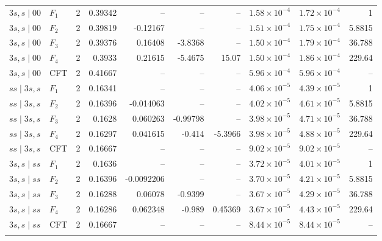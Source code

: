 \begin{longtable}{llcrrrrrrr}
\addlinespace[3pt]
$3s,s\mid 00$ & $F_1$ & 2 & 0.39342 & -- & -- & -- & $1.58\!\times\!10^{-4}$ & $1.72\!\times\!10^{-4}$ & 1 \\*
$3s,s\mid 00$ & $F_2$ & 2 & 0.39819 & -0.12167 & -- & -- & $1.51\!\times\!10^{-4}$ & $1.75\!\times\!10^{-4}$ & 5.8815 \\*
$3s,s\mid 00$ & $F_3$ & 2 & 0.39376 & 0.16408 & -3.8368 & -- & $1.50\!\times\!10^{-4}$ & $1.79\!\times\!10^{-4}$ & 36.788 \\*
$3s,s\mid 00$ & $F_4$ & 2 & 0.3933 & 0.21615 & -5.4675 & 15.07 & $1.50\!\times\!10^{-4}$ & $1.86\!\times\!10^{-4}$ & 229.64 \\*
$3s,s\mid 00$ & CFT & 2 & 0.41667 & -- & -- & -- & $5.96\!\times\!10^{-4}$ & $5.96\!\times\!10^{-4}$ & -- \\
\addlinespace[3pt]
$ss\mid 3s,s$ & $F_1$ & 2 & 0.16341 & -- & -- & -- & $4.06\!\times\!10^{-5}$ & $4.39\!\times\!10^{-5}$ & 1 \\*
$ss\mid 3s,s$ & $F_2$ & 2 & 0.16396 & -0.014063 & -- & -- & $4.02\!\times\!10^{-5}$ & $4.61\!\times\!10^{-5}$ & 5.8815 \\*
$ss\mid 3s,s$ & $F_3$ & 2 & 0.1628 & 0.060263 & -0.99798 & -- & $3.98\!\times\!10^{-5}$ & $4.71\!\times\!10^{-5}$ & 36.788 \\*
$ss\mid 3s,s$ & $F_4$ & 2 & 0.16297 & 0.041615 & -0.414 & -5.3966 & $3.98\!\times\!10^{-5}$ & $4.88\!\times\!10^{-5}$ & 229.64 \\*
$ss\mid 3s,s$ & CFT & 2 & 0.16667 & -- & -- & -- & $9.02\!\times\!10^{-5}$ & $9.02\!\times\!10^{-5}$ & -- \\
\addlinespace[3pt]
$3s,s\mid ss$ & $F_1$ & 2 & 0.1636 & -- & -- & -- & $3.72\!\times\!10^{-5}$ & $4.01\!\times\!10^{-5}$ & 1 \\*
$3s,s\mid ss$ & $F_2$ & 2 & 0.16396 & -0.0092206 & -- & -- & $3.70\!\times\!10^{-5}$ & $4.21\!\times\!10^{-5}$ & 5.8815 \\*
$3s,s\mid ss$ & $F_3$ & 2 & 0.16288 & 0.06078 & -0.9399 & -- & $3.67\!\times\!10^{-5}$ & $4.29\!\times\!10^{-5}$ & 36.788 \\*
$3s,s\mid ss$ & $F_4$ & 2 & 0.16286 & 0.062348 & -0.989 & 0.45369 & $3.67\!\times\!10^{-5}$ & $4.43\!\times\!10^{-5}$ & 229.64 \\*
$3s,s\mid ss$ & CFT & 2 & 0.16667 & -- & -- & -- & $8.44\!\times\!10^{-5}$ & $8.44\!\times\!10^{-5}$ & -- \\
\addlinespace[3pt]
\bottomrule\end{longtable}
